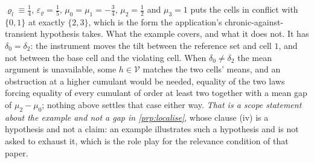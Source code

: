 \begin{remark}
\begin{enumerate}
$\varrho_l\equiv\tfrac14$, $\varepsilon_\varrho=\tfrac15$, $\mu_0=\mu_1=-\tfrac34$, $\mu_2=\tfrac12$ and
$\mu_3=1$ puts the cells in conflict with $\{0,1\}$ at exactly $\{2,3\}$, which is the form the
application's chronic-against-transient hypothesis takes.
What the example covers, and what it does not. It has $\delta_0=\delta_2$: the instrument moves
the tilt between the reference set and cell $1$, and not between the base cell and the violating cell.
When $\delta_0\neq\delta_2$ the mean argument is unavailable, some $h\in\mathcal V$ matches the two
cells' means, and an obstruction at a higher cumulant would be needed, equality of the two laws
forcing equality of every cumulant of order at least two together with a mean gap of $\mu_2-\mu_0$;
nothing above settles that case either way. \emph{That is a scope statement about the example and not a
gap in \cref{prp:localise}}, whose clause \textup{(iv)} is a hypothesis and not a claim: an example
illustrates such a hypothesis and is not asked to exhaust it, which is the role
\citet[Examples~1 and~2]{centorrinofeveflorens2019} play for the relevance condition of that paper.
\end{enumerate}
\end{remark}

